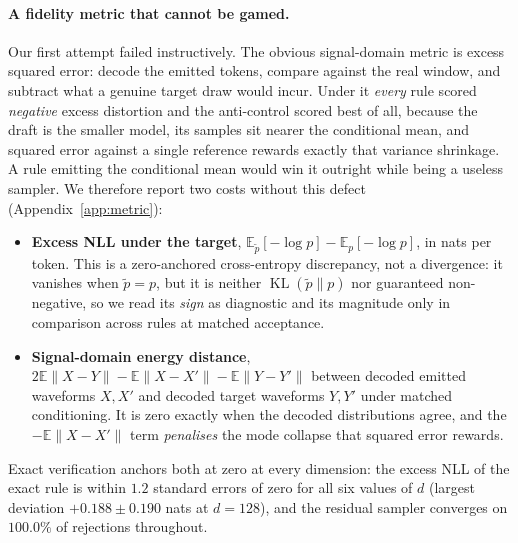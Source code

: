 \documentclass[10pt]{article}
\DeclareMathOperator{\KL}{KL}
\newcommand{\E}{\mathbb{E}}
\newcommand{\dd}{d}
\begin{document}
\paragraph{A fidelity metric that cannot be gamed.} Our first attempt failed instructively. The
obvious signal-domain metric is excess squared error: decode the emitted tokens, compare against the
real window, and subtract what a genuine target draw would incur. Under it \emph{every} rule scored
\emph{negative} excess distortion and the anti-control scored best of all, because the draft is the
smaller model, its samples sit nearer the conditional mean, and squared error against a single
reference rewards exactly that variance shrinkage. A rule emitting the conditional mean would win it
outright while being a useless sampler. We therefore report two costs without this defect
(Appendix~\ref{app:metric}):
\begin{itemize}
\itemsep1pt
\item \textbf{Excess NLL under the target}, $\E_{\tilde p}[-\log p] - \E_{p}[-\log p]$, in nats per
token. This is a zero-anchored cross-entropy discrepancy, not a divergence: it vanishes when
$\tilde p = p$, but it is neither $\KL(\tilde p \| p)$ nor guaranteed non-negative, so we read its
\emph{sign} as diagnostic and its magnitude only in comparison across rules at matched acceptance.
\item \textbf{Signal-domain energy distance}, $2\E\|X-Y\| - \E\|X-X'\| - \E\|Y-Y'\|$ between decoded
emitted waveforms $X,X'$ and decoded target waveforms $Y,Y'$ under matched conditioning. It is zero
exactly when the decoded distributions agree, and the $-\E\|X-X'\|$ term \emph{penalises} the mode
collapse that squared error rewards.
\end{itemize}
Exact verification anchors both at zero at every dimension: the excess NLL of the exact rule is
within $1.2$ standard errors of zero for all six values of $\dd$ (largest deviation $+0.188 \pm 0.190$
nats at $\dd{=}128$), and the residual sampler converges on $100.0\%$ of rejections throughout.
\end{document}
